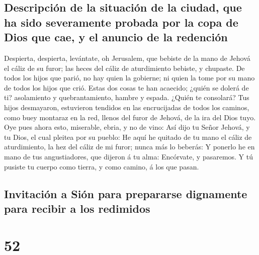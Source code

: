 \hypertarget{descripciuxf3n-de-la-situaciuxf3n-de-la-ciudad-que-ha-sido-severamente-probada-por-la-copa-de-dios-que-cae-y-el-anuncio-de-la-redenciuxf3n}{%
\subsection{Descripción de la situación de la ciudad, que ha sido
severamente probada por la copa de Dios que cae, y el anuncio de la
redención}\label{descripciuxf3n-de-la-situaciuxf3n-de-la-ciudad-que-ha-sido-severamente-probada-por-la-copa-de-dios-que-cae-y-el-anuncio-de-la-redenciuxf3n}}

 Despierta, despierta, levántate, oh Jerusalem, que
bebiste de la mano de Jehová el cáliz de su furor; las heces del cáliz
de aturdimiento bebiste, y chupaste.  De todos los hijos
que parió, no hay quien la gobierne; ni quien la tome por su mano de
todos los hijos que crió.  Estas dos cosas te han
acaecido; ¿quién se dolerá de ti? asolamiento y quebrantamiento, hambre
y espada. ¿Quién te consolará?  Tus hijos desmayaron,
estuvieron tendidos en las encrucijadas de todos los caminos, como buey
montaraz en la red, llenos del furor de Jehová, de la ira del Dios tuyo.
 Oye pues ahora esto, miserable, ebria, y no de vino:
 Así dijo tu Señor Jehová, y tu Dios, el cual pleitea por
su pueblo: He aquí he quitado de tu mano el cáliz de aturdimiento, la
hez del cáliz de mi furor; nunca más lo beberás:  Y
ponerlo he en mano de tus angustiadores, que dijeron á tu alma:
Encórvate, y pasaremos. Y tú pusiste tu cuerpo como tierra, y como
camino, á los que pasan.

\hypertarget{invitaciuxf3n-a-siuxf3n-para-prepararse-dignamente-para-recibir-a-los-redimidos}{%
\subsection{Invitación a Sión para prepararse dignamente para recibir a
los
redimidos}\label{invitaciuxf3n-a-siuxf3n-para-prepararse-dignamente-para-recibir-a-los-redimidos}}

\hypertarget{section-23-52}{%
\section{52}\label{section-23-52}}

